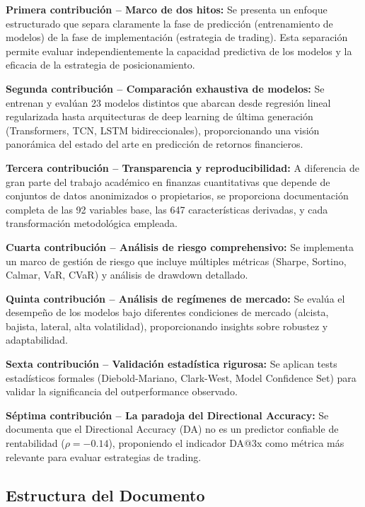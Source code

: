 \documentclass[11pt,a4paper]{article}
\begin{document}
\textbf{Primera contribuci\'on -- Marco de dos hitos:} Se presenta un enfoque estructurado que separa claramente la fase de predicci\'on (entrenamiento de modelos) de la fase de implementaci\'on (estrategia de trading). Esta separaci\'on permite evaluar independientemente la capacidad predictiva de los modelos y la eficacia de la estrategia de posicionamiento.

\textbf{Segunda contribuci\'on -- Comparaci\'on exhaustiva de modelos:} Se entrenan y eval\'uan 23 modelos distintos que abarcan desde regresi\'on lineal regularizada hasta arquitecturas de deep learning de \'ultima generaci\'on (Transformers, TCN, LSTM bidireccionales), proporcionando una visi\'on panor\'amica del estado del arte en predicci\'on de retornos financieros.

\textbf{Tercera contribuci\'on -- Transparencia y reproducibilidad:} A diferencia de gran parte del trabajo acad\'emico en finanzas cuantitativas que depende de conjuntos de datos anonimizados o propietarios, se proporciona documentaci\'on completa de las 92 variables base, las 647 caracter\'isticas derivadas, y cada transformaci\'on metodol\'ogica empleada.

\textbf{Cuarta contribuci\'on -- An\'alisis de riesgo comprehensivo:} Se implementa un marco de gesti\'on de riesgo que incluye m\'ultiples m\'etricas (Sharpe, Sortino, Calmar, VaR, CVaR) y an\'alisis de drawdown detallado.

\textbf{Quinta contribuci\'on -- An\'alisis de reg\'imenes de mercado:} Se eval\'ua el desempe\~no de los modelos bajo diferentes condiciones de mercado (alcista, bajista, lateral, alta volatilidad), proporcionando insights sobre robustez y adaptabilidad.

\textbf{Sexta contribuci\'on -- Validaci\'on estad\'istica rigurosa:} Se aplican tests estad\'isticos formales (Diebold-Mariano, Clark-West, Model Confidence Set) para validar la significancia del outperformance observado.

\textbf{S\'eptima contribuci\'on -- La paradoja del Directional Accuracy:} Se documenta que el Directional Accuracy (DA) no es un predictor confiable de rentabilidad ($\rho = -0.14$), proponiendo el indicador DA@3x como m\'etrica m\'as relevante para evaluar estrategias de trading.

\subsection{Estructura del Documento}
\end{document}
